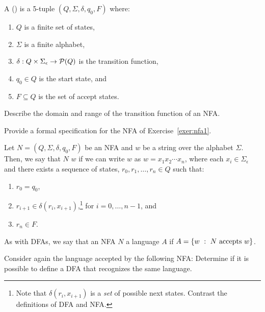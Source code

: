 \documentclass[twoside,letterpaper,openany]{book}
\begin{document}
\begin{defn}
A  () is a 5-tuple $(Q, \Sigma, \delta, q_0, F)$ where:
\begin{enumerate}
\item $Q$ is a finite set of states,
\item $\Sigma$ is a finite alphabet,
\item $\delta : Q \times \Sigma_\epsilon \to \mathcal{P}(Q)$ is the transition function,
\item $q_0 \in Q$ is the start state, and
\item $F \subseteq Q$ is the set of accept states.
\end{enumerate}

\end{defn}

\begin{exer}
Describe the domain and range of the transition function of an NFA.
\end{exer}

\begin{exer}
Provide a formal specification for the NFA of Exercise~\ref{exer:nfa1}.
\end{exer}

\begin{defn}
Let $N = (Q, \Sigma, \delta, q_0, F)$ be an NFA and $w$ be a string over the alphabet $\Sigma$. Then, we say that $N$  $w$ if we can write $w$ as $w = x_1 x_2 \cdots x_n$, where each $x_i \in \Sigma_\epsilon$ and there exists a sequence of states, $r_0, r_1, \ldots, r_n \in Q$ such that:
\begin{enumerate}
\item $r_0 = q_0$,
\item $r_{i+1} \in \delta(r_i, x_{i+1})$,\footnote{Note that $\delta(r_i, x_{i+1})$ is a \emph{set} of possible next states. Contrast the definitions of DFA and NFA.} for $i = 0, \ldots, n-1$, and
\item $r_n \in F$.
\end{enumerate}

As with DFAs, we say that an NFA $N$  a language $A$ if $A = \left\lbrace w\ :\ N~\textrm{accepts}~w \right\rbrace$.
\end{defn}

\begin{exer}
Consider again the language accepted by the following NFA:
\exernfaOne
Determine if it is possible to define a DFA that recognizes the same language.
\end{exer}
\end{document}
